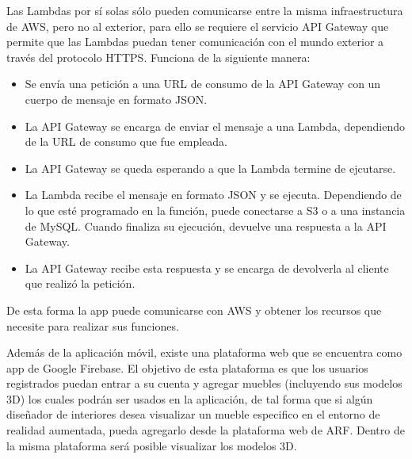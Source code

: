 \noindent
Las Lambdas por sí solas sólo pueden comunicarse entre la misma infraestructura de AWS, pero no al exterior, para ello se requiere el servicio API Gateway que permite que las Lambdas puedan tener comunicación con el mundo exterior a través del protocolo HTTPS. Funciona de la siguiente manera:
\begin{itemize}
	\item Se envía una petición a una URL de consumo de la API Gateway con un cuerpo de mensaje en formato JSON.
	\item La API Gateway se encarga de enviar el mensaje a una Lambda, dependiendo de la URL de consumo que fue empleada.
	\item La API Gateway se queda esperando a que la Lambda termine de ejcutarse.
	\item La Lambda recibe el mensaje en formato JSON y se ejecuta. Dependiendo de lo que esté programado en la función, puede conectarse a S3 o a una instancia de MySQL. Cuando finaliza su ejecución, devuelve una respuesta a la API Gateway.
	\item La API Gateway recibe esta respuesta y se encarga de devolverla al cliente que realizó la petición.
\end{itemize}

De esta forma la app puede comunicarse con AWS y obtener los recursos que necesite para realizar sus funciones.\par
Además de la aplicación móvil, existe una plataforma web que se encuentra como app de Google Firebase. El objetivo de esta plataforma es que los usuarios registrados puedan entrar a su cuenta y agregar muebles (incluyendo sus modelos 3D) los cuales podrán ser usados en la aplicación, de tal forma que si algún diseñador de interiores desea visualizar un mueble especifico en el entorno de realidad aumentada, pueda agregarlo desde la plataforma web de ARF. Dentro de la misma plataforma será posible visualizar los modelos 3D.



